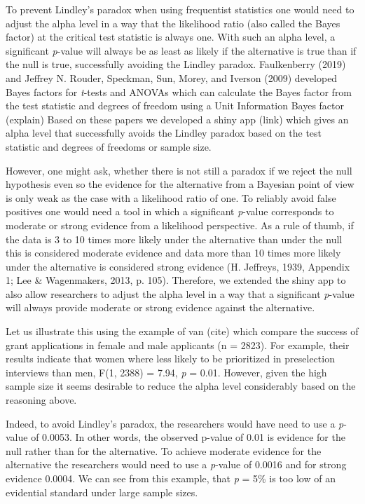 \documentclass[
  english,
  ,jou,floatsintext]{apa6}
\begin{document}
To prevent Lindley's paradox when using frequentist statistics one would need to adjust the alpha level in a way that the likelihood ratio (also called the Bayes factor) at the critical test statistic is always one. With such an alpha level, a significant \emph{p}-value will always be as least as likely if the alternative is true than if the null is true, successfully avoiding the Lindley paradox. Faulkenberry (2019) and Jeffrey N. Rouder, Speckman, Sun, Morey, and Iverson (2009) developed Bayes factors for \emph{t}-tests and ANOVAs which can calculate the Bayes factor from the test statistic and degrees of freedom using a Unit Information Bayes factor (explain)
Based on these papers we developed a shiny app (link) which gives an alpha level that successfully avoids the Lindley paradox based on the test statistic and degrees of freedoms or sample size.

However, one might ask, whether there is not still a paradox if we reject the null hypothesis even so the evidence for the alternative from a Bayesian point of view is only weak as the case with a likelihood ratio of one. To reliably avoid false positives one would need a tool in which a significant \emph{p}-value corresponds to moderate or strong evidence from a likelihood perspective. As a rule of thumb, if the data is 3 to 10 times more likely under the alternative than under the null this is considered moderate evidence and data more than 10 times more likely under the alternative is considered strong evidence (H. Jeffreys, 1939, Appendix 1; Lee \& Wagenmakers, 2013, p. 105). Therefore, we extended the shiny app to also allow researchers to adjust the alpha level in a way that a significant \emph{p}-value will always provide moderate or strong evidence against the alternative.

Let us illustrate this using the example of van (cite) which compare the success of grant applications in female and male applicants (n = 2823). For example, their results indicate that women where less likely to be prioritized in preselection interviews than men, F(1, 2388) = 7.94, \emph{p} = 0.01. However, given the high sample size it seems desirable to reduce the alpha level considerably based on the reasoning above.

Indeed, to avoid Lindley's paradox, the researchers would have need to use a \emph{p}-value of 0.0053. In other words, the observed p-value of 0.01 is evidence for the null rather than for the alternative. To achieve moderate evidence for the alternative the researchers would need to use a \emph{p}-value of 0.0016 and for strong evidence 0.0004. We can see from this example, that \emph{p} = 5\% is too low of an evidential standard under large sample sizes.
\end{document}
